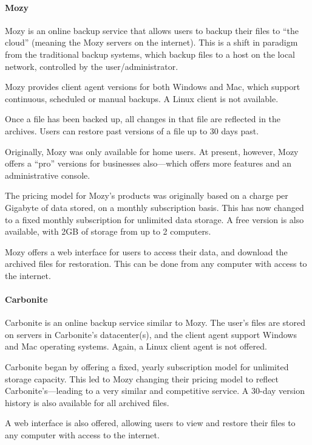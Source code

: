 \paragraph{Mozy}

Mozy is an online backup service that allows users to backup their files to
``the cloud'' (meaning the Mozy servers on the internet). This is a shift in
paradigm from the traditional backup systems, which backup files to a host on
the local network, controlled by the user/administrator.

Mozy provides client agent versions for both Windows and Mac, which support
continuous, scheduled or manual backups. A Linux client is not available.

Once a file has been backed up, all changes in that file are reflected in the
archives. Users can restore past versions of a file up to 30 days past.

Originally, Mozy was only available for home users. At present, however, Mozy
offers a ``pro'' versions for businesses also---which offers more features and
an administrative console.

The pricing model for Mozy's products was originally based on a charge per
Gigabyte of data stored, on a monthly subscription basis. This has now changed
to a fixed monthly subscription for unlimited data storage. A free version is
also available, with 2GB of storage from up to 2 computers.

Mozy offers a web interface for users to access their data, and download the
archived files for restoration. This can be done from any computer with access
to the internet.

\paragraph{Carbonite}

Carbonite is an online backup service similar to Mozy. The user's files are
stored on servers in Carbonite's datacenter(s), and the client agent support
Windows and Mac operating systems. Again, a Linux client agent is not offered.

Carbonite began by offering a fixed, yearly subscription model for unlimited
storage capacity. This led to Mozy changing their pricing model to reflect
Carbonite's---leading to a very similar and competitive service. A 30-day
version history is also available for all archived files.

A web interface is also offered, allowing users to view and restore their files
to any computer with access to the internet.

